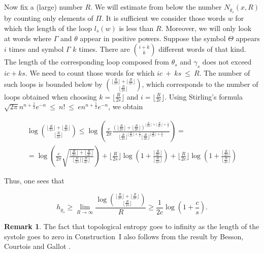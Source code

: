 \documentclass[12pt]{article}
\numberwithin{equation}{section}
\theoremstyle{definition}
\newtheorem{rem}[lem]{Remark}
\begin{document}
Now  fix a (large) number $R$. We will estimate from below the number $N_{g_s}(x, R)$ by counting only  elements of $\Pi$. It is sufficient we consider those words $w$ for which the length of the loop $l_s(w)$ is less than $R$. Moreover, we will only look at  words  where $\Gamma$ and $\theta$ appear in positive powers. Suppose the symbol $\Theta$ appears $i$ times and symbol $\Gamma$ $k$ times. There are $\binom{i+k}{k}$ different words of that kind. The length of the corresponding loop composed  from $\theta_s$ and $\gamma_s$  does not exceed $ic+ks$.
We need to count those words for which $ic~+~ks~\leqslant~R$. The number of such loops is bounded below by $\binom{\lfloor \frac{R}{2s} \rfloor + \lfloor \frac{R}{2c} \rfloor}{\lfloor \frac{R}{2s} \rfloor}$, which corresponds to the number of loops obtained when choosing $k=\lfloor \frac{R}{2s} \rfloor$ and $i=\lfloor \frac{R}{2c} \rfloor$. Using Stirling's formula $\sqrt{2\pi}n^{n+\frac{1}{2}}e^{-n}~\leqslant~n!~\leqslant~e n^{n+\frac{1}{2}}e^{-n}$, we obtain 

\begin{multline*}
\log \binom{\lfloor \frac{R}{2s} \rfloor + \lfloor \frac{R}{2c} \rfloor}{\lfloor \frac{R}{2s} \rfloor} \leqslant \log\left(\frac{e}{2\pi}\frac{\left(\lfloor \frac{R}{2s} \rfloor + \lfloor \frac{R}{2c} \rfloor\right)^{\lfloor \frac{R}{2s} \rfloor + \lfloor \frac{R}{2c} \rfloor+\frac{1}{2}}}{\lfloor \frac{R}{2s} \rfloor^{\lfloor \frac{R}{2s} \rfloor+\frac{1}{2}}\lfloor \frac{R}{2c} \rfloor^{\lfloor \frac{R}{2c} \rfloor+\frac{1}{2}}}\right) = \\ =\log\left(\frac{e}{2\pi}\sqrt{\frac{\lfloor \frac{R}{2s} \rfloor + \lfloor \frac{R}{2c} \rfloor}{\lfloor \frac{R}{2s} \rfloor\lfloor \frac{R}{2c} \rfloor}}\right)+\lfloor \frac{R}{2s} \rfloor\log\left(1+\frac{\lfloor \frac{R}{2c} \rfloor}{\lfloor \frac{R}{2s} \rfloor}\right) + \lfloor \frac{R}{2c} \rfloor\log\left(1+\frac{\lfloor \frac{R}{2s} \rfloor}{\lfloor \frac{R}{2c} \rfloor}\right)
\end{multline*}

Thus, one sees that

\begin{equation*}
h_{g_s}\geqslant \lim\limits_{R\rightarrow \infty}\frac{\log\binom{\lfloor \frac{R}{2s} \rfloor + \lfloor \frac{R}{2c} \rfloor}{\lfloor \frac{R}{2s} \rfloor}}{R} \geqslant \frac{1}{2c}\log\left(1+\frac{c}{s}\right).
\end{equation*}


\begin{rem} 
The fact that topological entropy goes to infinity as the length of the systole goes to zero in Construction~I also follows from the result by Besson, Courtois and Gallot \cite[Corollaire 0.6]{BCG_margulis}.
\end{rem}
\end{document}
